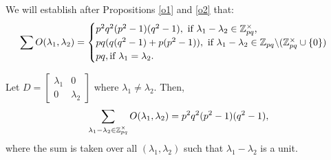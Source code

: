 \documentclass[11pt, titlepage, a4paper]{article}
\begin{document}
We will establish after Propositions \ref{o1} and \ref{o2} that: 
\begin{align*}
 \sum O(\lambda_{1},\lambda_{2}) = 
\begin{cases}
 p^{2}q^{2}(p^{2} -1)(q^{2} - 1), \text{ if $\lambda_{1}-\lambda_{2} \in \mathbb{Z}_{pq}^{\times}$,} \\
 pq(q(q^{2}-1) + p(p^{2}-1)), \text{ if $\lambda_{1}-\lambda_{2} \in \mathbb{Z}_{pq} \backslash (\mathbb{Z}_{pq}^{\times} \cup \{0\})$} \\
 pq, \text{if $\lambda_{1}=\lambda_{2}.$}
\end{cases}
\end{align*}


\begin{proposition}\label{o1}
 Let $D = 
\begin{bmatrix}
 \lambda_{1} & 0 \\
 0 & \lambda_{2}
\end{bmatrix} 
$ where $\lambda_{1}\neq \lambda_{2}.$ Then,
\begin{align*}
\sum_{\lambda_{1}-\lambda_{2} \in \mathbb{Z}_{pq}^{\times}} O(\lambda_{1},\lambda_{2}) = p^{2}q^{2}(p^{2}-1)(q^{2}-1),
\end{align*}
where the sum is taken over all $(\lambda_{1},\lambda_{2})$ such that $\lambda_{1}-\lambda_{2}$ is a unit.
\end{proposition}
\end{document}
